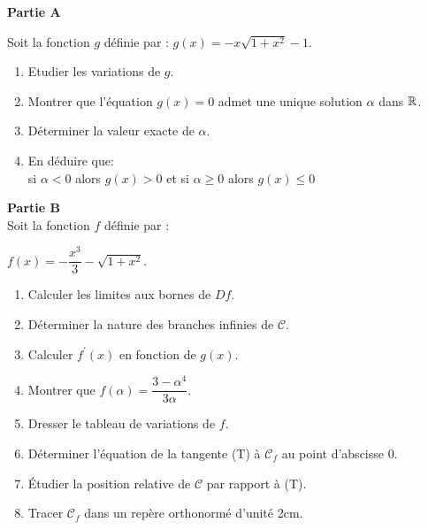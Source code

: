 \begin{exercice}

\textbf{Partie A}

Soit la fonction $ g $ définie par :
$ g(x)=-x\sqrt{1+x^{2}}-1 $.
\begin{enumerate}
\item Etudier les variations de $ g $.
\item Montrer que l'équation $ g(x)=0 $  admet une unique  solution $ \alpha $ dans $ \mathbb{R} $.
\item Déterminer la valeur  exacte de $ \alpha  $.
\item En déduire que:\\ si $ \alpha<0$ alors  $ g(x) >0$  et si $ \alpha\geq 0$ alors  $ g(x) \leq0$ 
\end{enumerate}
\medskip

 \textbf{ Partie B}\\
Soit la fonction $ f $ définie par :

\medskip 

$ f(x)= -\dfrac{x^{3}}{3}- \sqrt{1+x^{2}}$.
\begin{enumerate}
\item Calculer les limites aux bornes de $Df $.
\item Déterminer la nature des branches infinies de $ \mathcal{C}$.
\item Calculer  $ f^{\prime}(x) $ en fonction de $ g(x) $.
\item Montrer que $ f(\alpha)= \dfrac{3-\alpha^{4}}{3\alpha}$.
\item  Dresser le tableau de variations de $ f $.
\item Déterminer l'équation de la tangente (T) à $ \mathcal{C}_f $ au point d'abscisse $ 0. $
\item Étudier la position relative  de $ \mathcal{C}$ par rapport à (T).
\item Tracer  $ \mathcal{C}_f $ dans un repère orthonormé d'unité 2cm.
\end{enumerate}
\end{exercice}

